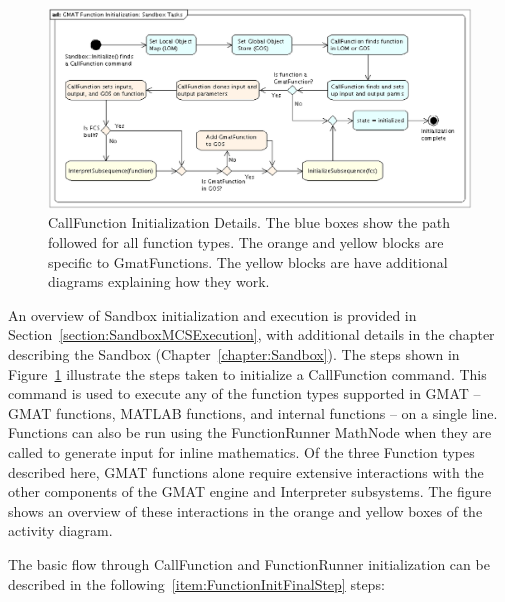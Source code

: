 \begin{figure}[htb]
\begin{center}
\includegraphics[scale=0.5]{Images/GMATFunctionInitializationSandboxTasks.eps}
\caption[CallFunction Initialization
Details]{\label{figure:FunctionInitializationOverview}CallFunction Initialization Details.  The blue
boxes show the path followed for all function types.  The orange and yellow blocks are specific to
GmatFunctions.  The yellow blocks are have additional diagrams explaining how they work.}
\end{center}
\end{figure}

An overview of Sandbox initialization and execution is provided in
Section~\ref{section:SandboxMCSExecution}, with additional details in the chapter describing the
Sandbox (Chapter~\ref{chapter:Sandbox}).  The steps shown in
Figure~\ref{figure:FunctionInitializationOverview} illustrate the steps taken to initialize a
CallFunction command.  This command is used to execute any of the function types supported in GMAT
-- GMAT functions, MATLAB functions, and internal functions -- on a single line.  Functions can
also be run using the FunctionRunner MathNode when they are called to generate input for inline
mathematics.  Of the three Function types described here, GMAT functions alone require extensive
interactions with the other components of the GMAT engine and Interpreter subsystems.  The figure
shows an overview of these interactions in the orange and yellow boxes of the activity diagram.

The basic flow through CallFunction and FunctionRunner initialization can be described in the
following~\ref{item:FunctionInitFinalStep} steps:

